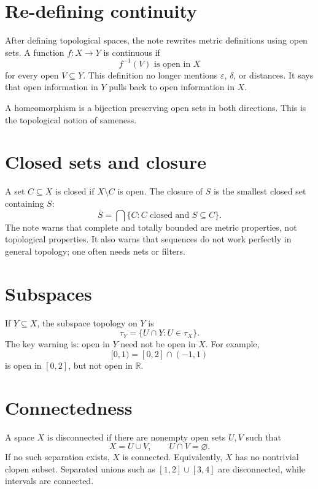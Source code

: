
\section{Re-defining continuity}

After defining topological spaces, the note rewrites metric definitions using open sets.  A function \(f:X\to Y\) is continuous if
\[
  f^{-1}(V)\text{ is open in }X
\]
for every open \(V\subseteq Y\).  This definition no longer mentions \(\varepsilon\), \(\delta\), or distances.  It says that open information in \(Y\) pulls back to open information in \(X\).

A homeomorphism is a bijection preserving open sets in both directions.  This is the topological notion of sameness.

\section{Closed sets and closure}

A set \(C\subseteq X\) is closed if \(X\setminus C\) is open.  The closure of \(S\) is the smallest closed set containing \(S\):
\[
  \overline S=\bigcap\{C:C\text{ closed and }S\subseteq C\}.
\]
The note warns that complete and totally bounded are metric properties, not topological properties.  It also warns that sequences do not work perfectly in general topology; one often needs nets or filters.

\section{Subspaces}

If \(Y\subseteq X\), the subspace topology on \(Y\) is
\[
  \tau_Y=\{U\cap Y:U\in\tau_X\}.
\]
The key warning is: open in \(Y\) need not be open in \(X\).  For example,
\[
  [0,1)=[0,2]\cap(-1,1)
\]
is open in \([0,2]\), but not open in \(\mathbb R\).

\section{Connectedness}

A space \(X\) is disconnected if there are nonempty open sets \(U,V\) such that
\[
  X=U\cup V,\qquad U\cap V=\varnothing.
\]
If no such separation exists, \(X\) is connected.  Equivalently, \(X\) has no nontrivial clopen subset.  Separated unions such as \([1,2]\cup[3,4]\) are disconnected, while intervals are connected.

